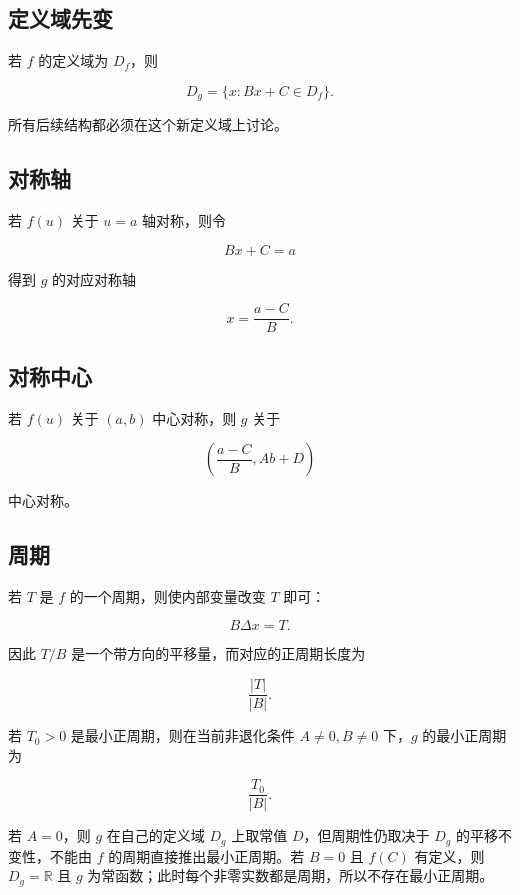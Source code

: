 \documentclass[11pt,a4paper]{ctexart}
\begin{document}
\subsection{定义域先变}\label{ux5b9aux4e49ux57dfux5148ux53d8}

若 \(f\) 的定义域为 \(D_f\)，则

\[
\boxed{D_g=\{x:Bx+C\in D_f\}}.
\]

所有后续结构都必须在这个新定义域上讨论。

\subsection{对称轴}\label{ux5bf9ux79f0ux8f74}

若 \(f(u)\) 关于 \(u=a\) 轴对称，则令

\[
Bx+C=a
\]

得到 \(g\) 的对应对称轴

\[
\boxed{x=\frac{a-C}{B}}.
\]

\subsection{对称中心}\label{ux5bf9ux79f0ux4e2dux5fc3}

若 \(f(u)\) 关于 \((a,b)\) 中心对称，则 \(g\) 关于

\[
\boxed{\left(\frac{a-C}{B},Ab+D\right)}
\]

中心对称。

\subsection{周期}\label{ux5468ux671f-1}

若 \(T\) 是 \(f\) 的一个周期，则使内部变量改变 \(T\) 即可：

\[
B\Delta x=T.
\]

因此 \(T/B\) 是一个带方向的平移量，而对应的正周期长度为

\[
\boxed{\frac{\lvert T\rvert}{\lvert B\rvert}}.
\]

若 \(T_0>0\) 是最小正周期，则在当前非退化条件 \(A\ne0,B\ne0\) 下，\(g\) 的最小正周期为

\[
\boxed{\frac{T_0}{\lvert B\rvert}}.
\]

若 \(A=0\)，则 \(g\) 在自己的定义域 \(D_g\) 上取常值 \(D\)，但周期性仍取决于 \(D_g\) 的平移不变性，不能由 \(f\) 的周期直接推出最小正周期。若 \(B=0\) 且 \(f(C)\) 有定义，则 \(D_g=\mathbb R\) 且 \(g\) 为常函数；此时每个非零实数都是周期，所以不存在最小正周期。
\end{document}
